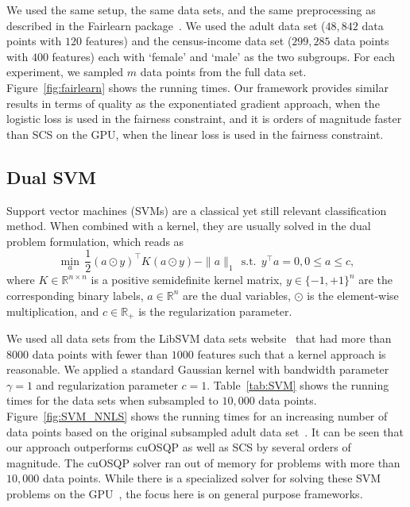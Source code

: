 \documentclass[letterpaper]{article} %
\DeclareMathOperator{\st}{s.t.}
\newcommand{\setR}{\mathbb{R}}
\begin{document}
We used the same setup, the same data sets, and the same preprocessing as described in the Fairlearn package~\cite{bird2020fairlearn}. We used the adult data set ($48,842$ data points with $120$ features) and the census-income data set ($299,285$ data points with $400$ features) each with `female' and `male' as the two subgroups. For each experiment, we sampled $m$ data points from the full data set. Figure~\ref{fig:fairlearn} shows the running times. Our framework provides similar results in terms of quality as the exponentiated gradient approach, when the logistic loss is used in the fairness constraint, and it is orders of magnitude faster than SCS on the GPU, when the linear loss is used in the fairness constraint.


\subsection{Dual SVM}

Support vector machines (SVMs) are a classical yet still relevant classification method. When combined with a kernel, they are usually solved in the dual problem formulation, which reads as
\[
\min_{a}\, \frac{1}{2} (a\odot y)^\top K (a\odot y) - \|a\|_1
  \, \st\, y^\top a = 0, 0\leq a\leq c,
\]
where $K\in\setR^{n\times n}$ is a positive semidefinite kernel matrix, $y\in \{-1, +1\}^n$ are the corresponding binary labels, $a\in\setR^n$ are the dual variables, $\odot$ is the element-wise multiplication, and $c\in\setR_+$ is the regularization parameter. %

We used all data sets from the LibSVM data sets website~\cite{libsvmData} that had more than $8000$ data points with fewer than $1000$ features such that a kernel approach is reasonable. We applied a standard Gaussian kernel with bandwidth parameter $\gamma=1$ and regularization parameter $c=1$. Table~\ref{tab:SVM} shows the running times for the data sets when subsampled to $10,000$ data points. Figure~\ref{fig:SVM_NNLS} shows the running times for an increasing number of data points based on the original subsampled adult data set~\cite{libsvmData}. It can be seen that our approach outperforms \mbox{cuOSQP} as well as SCS by several orders of magnitude. The cuOSQP solver ran out of memory for problems with more than $10,000$ data points. While there is a specialized solver for solving these SVM problems on the GPU~\cite{thundersvm18}, the focus here is on general purpose frameworks.
\end{document}
